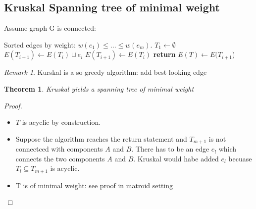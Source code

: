 \documentclass{article}
\newtheorem*{theorem}{Theorem}
\theoremstyle{definition}
\theoremstyle{remark}
\newtheorem*{remark}{Remark}
\begin{document}
\subsection*{Kruskal Spanning tree of minimal weight}
Assume graph G is connected:
\begin{algorithm}
    
    \begin{algorithmic}
    \Require Sorted edges by weight: $w(e_1) \leq ... \leq w(e_m)$.
    \State $T_1 \gets \emptyset$
            \State $E(T_{i+1}) \gets E(T_i) \sqcup e_i $
        \Else
            \State $E(T_{i+1}) \gets E(T_i) $
        \EndIf
            \State \textbf{return} $E(T) \gets E(T_{i+1}$)
        \EndIf
    \EndFor
    \end{algorithmic}
\end{algorithm}
\begin{remark}
    Kurskal is a so greedy algorithm: add best looking edge
\end{remark}
\begin{theorem}
    Kruskal yields a spanning tree of minimal weight
\end{theorem}
\begin{proof}
    $ $\\
    \begin{itemize}
        \item $T$ is acyclic by construction.
        \item Suppose the algorithm reaches the return statement and $T_{m+1}$ is not connectced with components $A$ and $B$. There has to be an edge $e_l$ which connects the two components $A$ and $B$. Kruskal would habe added $e_l$ becuase $T_l \subseteq T_{m+1}$ is acyclic.
        \item T is of minimal weight: see proof in matroid setting
    \end{itemize} 
\end{proof}
\end{document}

